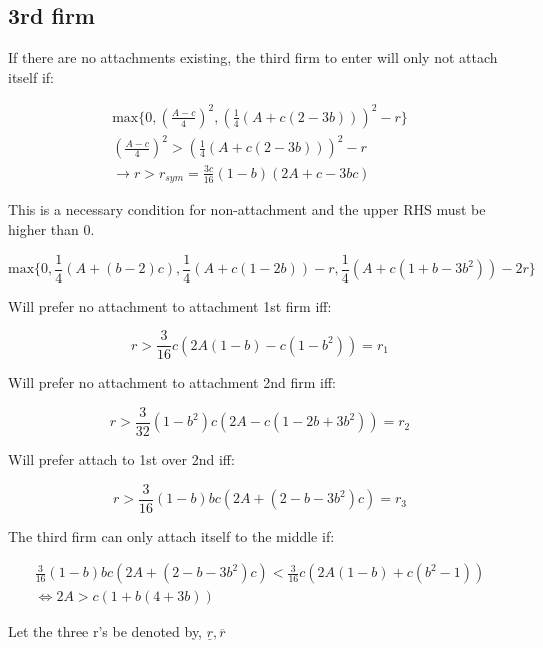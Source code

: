 \documentclass{article}
\begin{document}
\subsection{3rd firm}

If there are no attachments existing, the third firm to enter will only not attach itself if:

\begin{align*}
\text{max} 
\{ 0,
\left(\frac{A-c}{4}\right)^2, 
 \left( \frac{1}{4}(A+c(2-3b))\right)^2-r
\}
\\
\left(\frac{A-c}{4}\right)^2> \left(\frac{1}{4}(A+c(2-3b))\right)^2-r \\
\rightarrow 
r> r_{sym} = \frac{3c}{16}(1-b)(2A+c-3bc)
\end{align*}

This is a necessary condition for non-attachment and the upper RHS must be higher than 0.

\begin{equation*}
\text{max} \{
0,
\frac{1}{4}(A+(b-2)c), \frac{1}{4} (A+c(1-2b))-r, \frac{1}{4}(A+c(1+b-3b^2))-2r \}
\end{equation*}

Will prefer no attachment to attachment 1st firm iff:

\begin{equation*}
r> \frac{3}{16} c \left(2 A (1-b)-c(1-b^2 ) \right) = r_1
\end{equation*}

Will prefer no attachment to attachment 2nd firm iff:

\begin{equation*}
r > \frac{3}{32} \left(1-b^2\right) c \left(2 A-c(1-2b+3 b^2) \right) = r_2
\end{equation*}


Will prefer attach to 1st over 2nd iff:

\begin{equation*}
r > \frac{3}{16} (1 - b) b c (2 A + (2 - b - 3 b^2) c) = r_3
\end{equation*}

The third firm can only attach itself to the middle if:

\begin{align*}
\frac{3}{16} (1 - b) b c (2 A + (2 - b - 3 b^2) c)<\frac{3}{16} c \left(2 A (1-b)+c(b^2 -1) \right) \\ 
\Leftrightarrow 
2A>c(1+b(4+3b))
\end{align*}


Let the three r's be denoted by, $\underline{r},\overline{r}$
\end{document}
